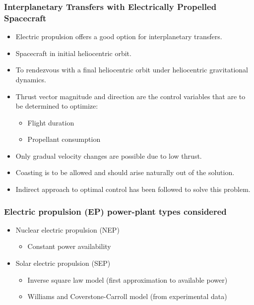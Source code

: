 \documentclass{beamer}
\begin{document}
\begin{frame}
\frametitle{Interplanetary Transfers with Electrically Propelled Spacecraft}
\begin{itemize}
	\vspace{-3mm}
	\item Electric propulsion offers a good option for interplanetary transfers.
	\pause
	\item Spacecraft in initial heliocentric orbit.
	\pause
	\item To rendezvous with a final heliocentric orbit under heliocentric gravitational dynamics.
	\pause
	\item Thrust vector magnitude and direction are the control variables that are to be determined to optimize:
	\begin{itemize}
		\item Flight duration
		\item Propellant consumption
	\end{itemize}
	\pause
	\item Only gradual velocity changes are possible due to low thrust.
	\pause
	\item Coasting is to be allowed and should arise naturally out of the solution.
	\pause
	\item Indirect approach to optimal control has been followed to solve this problem.
\end{itemize}
\end{frame}


\begin{frame}
	\frametitle{Electric propulsion (EP) power-plant types considered}
	\begin{itemize}
		\item Nuclear electric propulsion (NEP) 
		\begin{itemize}
			\item Constant power availability
		\end{itemize}
		\item Solar electric propulsion (SEP)
		\begin{itemize}
			\item Inverse square law model (first approximation to available power)
			\item Williams and Coverstone-Carroll model (from experimental data)
		\end{itemize}
	\end{itemize}
\end{frame}
\end{document}

